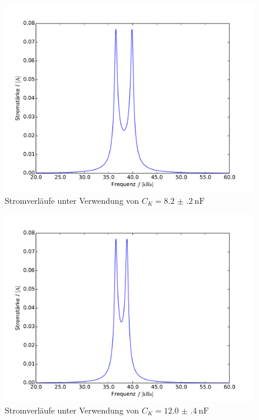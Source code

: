 	\begin{figure}[!h]
		\centering
    	\includegraphics[scale=0.7]{Grafiken/Stromverlauf5.pdf}
		\caption{Stromverläufe unter Verwendung von $C_{K} = \SI{8.2(2)}{\nano\farad}$}
		\label{fig:C5} 
	\end{figure}	
	
	\begin{figure}[!h]
		\centering
    	\includegraphics[scale=0.7]{Grafiken/Stromverlauf7.pdf}
		\caption{Stromverläufe unter Verwendung von $C_{K} = \SI{12.0(4)}{\nano\farad}$}
		\label{fig:C7} 
	\end{figure}	
%	
%
%	
	